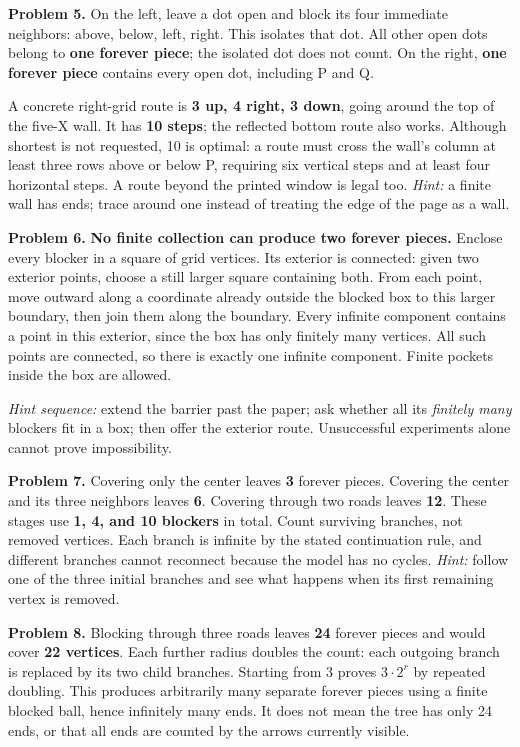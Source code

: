 \documentclass[11pt,letterpaper]{article}
\begin{document}
\textbf{Problem 5.} On the left, leave a dot open and block its four immediate neighbors: above, below, left, right. This isolates that dot. All other open dots belong to \textbf{one forever piece}; the isolated dot does not count. On the right, \textbf{one forever piece} contains every open dot, including P and Q.

A concrete right-grid route is \textbf{3 up, 4 right, 3 down}, going around the top of the five-X wall. It has \textbf{10 steps}; the reflected bottom route also works. Although shortest is not requested, 10 is optimal: a route must cross the wall's column at least three rows above or below P, requiring six vertical steps and at least four horizontal steps. A route beyond the printed window is legal too. \emph{Hint:} a finite wall has ends; trace around one instead of treating the edge of the page as a wall.

\textbf{Problem 6.} \textbf{No finite collection can produce two forever pieces.} Enclose every blocker in a square of grid vertices. Its exterior is connected: given two exterior points, choose a still larger square containing both. From each point, move outward along a coordinate already outside the blocked box to this larger boundary, then join them along the boundary. Every infinite component contains a point in this exterior, since the box has only finitely many vertices. All such points are connected, so there is exactly one infinite component. Finite pockets inside the box are allowed.

\emph{Hint sequence:} extend the barrier past the paper; ask whether all its \emph{finitely many} blockers fit in a box; then offer the exterior route. Unsuccessful experiments alone cannot prove impossibility.

\textbf{Problem 7.} Covering only the center leaves \textbf{3} forever pieces. Covering the center and its three neighbors leaves \textbf{6}. Covering through two roads leaves \textbf{12}. These stages use \textbf{1, 4, and 10 blockers} in total. Count surviving branches, not removed vertices. Each branch is infinite by the stated continuation rule, and different branches cannot reconnect because the model has no cycles. \emph{Hint:} follow one of the three initial branches and see what happens when its first remaining vertex is removed.

\textbf{Problem 8.} Blocking through three roads leaves \textbf{24} forever pieces and would cover \textbf{22 vertices}. Each further radius doubles the count: each outgoing branch is replaced by its two child branches. Starting from 3 proves $3\cdot2^r$ by repeated doubling. This produces arbitrarily many separate forever pieces using a finite blocked ball, hence infinitely many ends. It does not mean the tree has only 24 ends, or that all ends are counted by the arrows currently visible.
\end{document}
